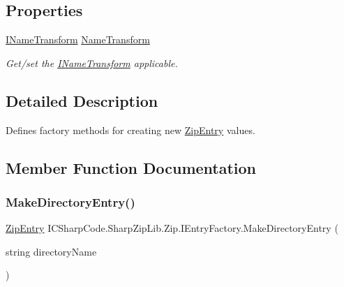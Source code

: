 \subsection*{Properties}
\begin{DoxyCompactItemize}
\item 
\hyperlink{interface_i_c_sharp_code_1_1_sharp_zip_lib_1_1_core_1_1_i_name_transform}{I\+Name\+Transform} \hyperlink{interface_i_c_sharp_code_1_1_sharp_zip_lib_1_1_zip_1_1_i_entry_factory_a64ca753509472a47cd72acd4cb754c28}{Name\+Transform}
\begin{DoxyCompactList}\small\item\em Get/set the \hyperlink{}{I\+Name\+Transform} applicable. \end{DoxyCompactList}\end{DoxyCompactItemize}


\subsection{Detailed Description}
Defines factory methods for creating new \hyperlink{class_i_c_sharp_code_1_1_sharp_zip_lib_1_1_zip_1_1_zip_entry}{Zip\+Entry} values. 



\subsection{Member Function Documentation}
\mbox{\label{interface_i_c_sharp_code_1_1_sharp_zip_lib_1_1_zip_1_1_i_entry_factory_ac7abeeef0810ca110b63406bc1dfab0e}} 
\subsubsection{\texorpdfstring{Make\+Directory\+Entry()}{MakeDirectoryEntry()}\hspace{0.1cm}{\footnotesize\ttfamily [1/2]}}
{\footnotesize\ttfamily \hyperlink{class_i_c_sharp_code_1_1_sharp_zip_lib_1_1_zip_1_1_zip_entry}{Zip\+Entry} I\+C\+Sharp\+Code.\+Sharp\+Zip\+Lib.\+Zip.\+I\+Entry\+Factory.\+Make\+Directory\+Entry (\begin{DoxyParamCaption}\item[{string}]{directory\+Name }\end{DoxyParamCaption})}




